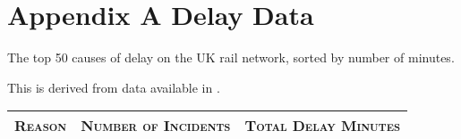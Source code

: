 
\chapter{Appendix A Delay Data}
\label{app:delaydata}
The top 50 causes of delay on the UK rail network, sorted by number of minutes.

This is derived from data available in \citep{NetworkRailInfrastructureLtd2017}.


\begin{landscape}

\begin{longtabu} to \linewidth {|X[1 , p ] |X[0.4 , c ] | X[0.4 , c ]}\firsthline\hline
\textsc{Reason}  &\textsc{Number of Incidents} & \textsc{Total Delay Minutes} \\ \hline
%
\endhead



\end{longtabu}
\end{landscape}
